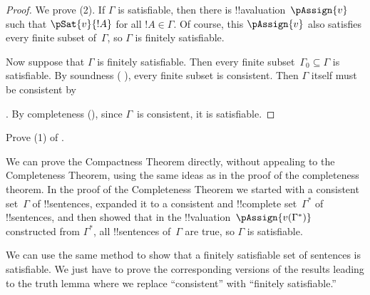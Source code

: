 \begin{proof}
We prove (2).  If $\Gamma$ is satisfiable, then there is
!!a{valuation}~$\pAssign{v}$
such that $\pSat{v}{!A}$ for all $!A \in
\Gamma$.  Of course, this $\pAssign{v}$ also
satisfies every finite subset of~$\Gamma$, so $\Gamma$ is finitely
satisfiable.

Now suppose that $\Gamma$ is finitely satisfiable.  Then every finite
subset~$\Gamma_0 \subseteq \Gamma$ is satisfiable.  By soundness
(
  ),
every finite subset is consistent.  Then $\Gamma$ itself must be
consistent by

  .
By completeness (), since $\Gamma$~is
consistent, it is satisfiable.
\end{proof}




\begin{prob}
Prove (1) of .
\end{prob}














We can prove the Compactness Theorem directly, without appealing to
the Completeness Theorem, using the same ideas as in the proof of the
completeness theorem.  In the proof of the Completeness Theorem we
started with a consistent set~$\Gamma$ of !!{sentence}s, expanded it
to a consistent and !!{complete}
set~$\Gamma^*$ of !!{sentence}s, and then showed that in the
!!{valuation}~$\pAssign{v(\Gamma^*)}$
constructed from $\Gamma^*$, all !!{sentence}s of~$\Gamma$ are true,
so $\Gamma$ is satisfiable.

We can use the same method to show that a finitely satisfiable set of
sentences is satisfiable. We just have to prove the corresponding
versions of the results leading to the truth lemma where we replace
``consistent'' with ``finitely satisfiable.''


